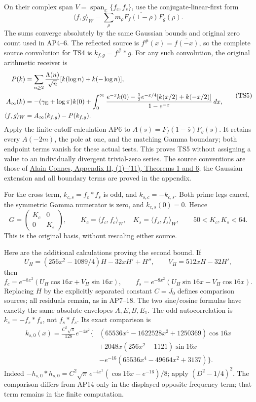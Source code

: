 On their complex span \(V=\operatorname{span}_{\mathbb C}\{f_c,f_s\}\),
use the conjugate-linear-first form
\[
 \langle f,g\rangle_W
 =\sum_\rho m_\rho\overline{F_f(1-\overline\rho)}F_g(\rho).
 \tag{TS4}
\]
The sums converge absolutely by the same Gaussian bounds and original
zero count used in AP4--6. The reflected source is
\(f^\#(x)=\overline{f(-x)}\), so the complete source convolution
for TS4 is \(k_{f,g}=f^\#*g\). For any such convolution,
the original arithmetic receiver is
\[
\begin{split}
 P(k)&=\sum_{n\ge2}\frac{\Lambda(n)}{\sqrt n}
                    [k(\log n)+k(-\log n)],\\
 A_\infty(k)&=-(\gamma_{\rm E}+\log\pi)k(0)
 +\int_0^\infty
 \frac{e^{-x}k(0)-\frac12e^{-x/4}[k(x/2)+k(-x/2)]}{1-e^{-x}}\,dx,\\
 \langle f,g\rangle_W&=A_\infty(k_{f,g})-P(k_{f,g}).
\end{split}\tag{TS5}
\]
Apply the finite-cutoff calculation AP6 to
\(A(s)=\overline{F_f(1-\overline s)}F_g(s)\). It retains
every \(A(-2m)\), the pole at one, and the matching Gamma boundary;
both endpoint terms vanish for these actual tests. This proves TS5
without assigning a value to an individually divergent trivial-zero
series. The source conventions are those of
\href{https://arxiv.org/abs/math/9811068v1}{Alain Connes,
Appendix II, (1)--(11), Theorems 1 and 6}; the Gaussian extension
and all boundary terms are proved in the appendix.

For the cross term, \(k_{c,s}=f_c*f_s\) is odd, and
\(k_{s,c}=-k_{c,s}\). Both prime legs cancel, the symmetric Gamma
numerator is zero, and \(k_{c,s}(0)=0\). Hence
\[
 G=\begin{pmatrix}K_c&0\\0&K_s\end{pmatrix},\qquad
 K_c=\langle f_c,f_c\rangle_W,\quad
 K_s=\langle f_s,f_s\rangle_W,
 \qquad 50<K_c,K_s<64.\tag{TS6}
\]
This is the original basis, without rescaling either source.

Here are the additional calculations proving the second bound.
If
\[
 U_H=(256x^2-1089/4)H-32xH'+H'',\qquad
 V_H=512xH-32H',
\]
then
\[
 f_c=e^{-8x^2}(U_H\cos16x+V_H\sin16x),\qquad
 f_s=e^{-8x^2}(U_H\sin16x-V_H\cos16x).\tag{TS7}
\]
Replacing \(H\) by the explicitly separated constant \(C=J_0\)
defines comparison sources; all residuals remain, as in AP7--18.
The two sine/cosine formulas have exactly the same absolute
envelopes \(A,E,B,E_1\). The odd autocorrelation is
\(k_s=-f_s*f_s\), not \(f_s*f_s\). Its exact comparison is
\[
\begin{split}
 k_{s,0}(x)=\frac{C^2\sqrt\pi}{128}e^{-4x^2}\bigl\{&
 (65536x^4-1622528x^2+1250369)\cos16x\\
 &+2048x(256x^2-1121)\sin16x\\
 &-e^{-16}(65536x^4-49664x^2+3137)\bigr\}.
\end{split}\tag{TS8}
\]
Indeed \(-h_{s,0}*h_{s,0}=C^2\sqrt\pi\,e^{-4x^2}
(\cos16x-e^{-16})/8\); apply \((D^2-1/4)^2\).
The comparison differs from AP14 only in the displayed opposite-frequency
term; that term remains in the finite computation.

